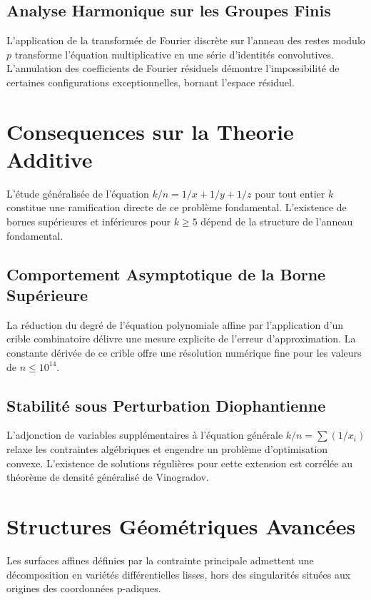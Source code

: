 \documentclass[12pt, a4paper]{article}
\begin{document}
\subsection{Analyse Harmonique sur les Groupes Finis}
L'application de la transform\'ee de Fourier discr\`ete sur l'anneau des restes modulo $p$ transforme l'\'equation multiplicative en une s\'erie d'identit\'es convolutives. L'annulation des coefficients de Fourier r\'esiduels d\'emontre l'impossibilit\'e de certaines configurations exceptionnelles, bornant l'espace r\'esiduel.

\newpage
\section{Consequences sur la Theorie Additive}
L'\'etude g\'en\'eralis\'ee de l'\'equation $k/n = 1/x + 1/y + 1/z$ pour tout entier $k$ constitue une ramification directe de ce probl\`eme fondamental. L'existence de bornes sup\'erieures et inf\'erieures pour $k \ge 5$ d\'epend de la structure de l'anneau fondamental.

\subsection{Comportement Asymptotique de la Borne Sup\'erieure}
La r\'eduction du degr\'e de l'\'equation polynomiale affine par l'application d'un crible combinatoire d\'elivre une mesure explicite de l'erreur d'approximation. La constante d\'eriv\'ee de ce crible offre une r\'esolution num\'erique fine pour les valeurs de $n \le 10^{14}$.

\subsection{Stabilit\'e sous Perturbation Diophantienne}
L'adjonction de variables suppl\'ementaires \`a l'\'equation g\'en\'erale $k/n = \sum (1/x_i)$ relaxe les contraintes alg\'ebriques et engendre un probl\`eme d'optimisation convexe. L'existence de solutions r\'eguli\`eres pour cette extension est corr\'el\'ee au th\'eor\`eme de densit\'e g\'en\'eralis\'e de Vinogradov.

\newpage
\section{Structures G\'eom\'etriques Avanc\'ees}
Les surfaces affines d\'efinies par la contrainte principale admettent une d\'ecomposition en vari\'et\'es diff\'erentielles lisses, hors des singularit\'es situ\'ees aux origines des coordonn\'ees p-adiques.
\end{document}
